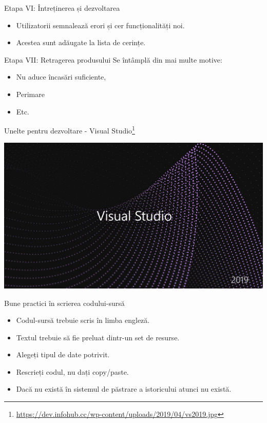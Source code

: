 \documentclass[presentation]{beamer}
\begin{document}
\begin{frame}[label={sec:orgb32584a}]{Etapa VI: Întreținerea și dezvoltarea}
\begin{itemize}
\item Utilizatorii semnalează erori și cer funcționalități noi.
\item Acestea sunt adăugate la lista de cerințe.
\end{itemize}
\end{frame}
\begin{frame}[label={sec:org1072855}]{Etapa VII: Retragerea produsului}
Se întâmplă din mai multe motive:
\begin{itemize}
\item Nu aduce încasări suficiente,
\item Perimare
\item Etc.
\end{itemize}
\end{frame}
\begin{frame}[label={sec:org5a62abc}]{Unelte pentru dezvoltare - Visual Studio\footnote{\url{https://dev.infohub.cc/wp-content/uploads/2019/04/vs2019.jpg}}}
\begin{center}
\includegraphics[width=.9\linewidth]{img/vs2019.jpg}
\end{center}
\end{frame}
\begin{frame}[label={sec:orgd224fc1}]{Bune practici în scrierea codului-sursă}
\begin{itemize}
\item Codul-sursă trebuie scris în limba engleză.
\item Textul trebuie să fie preluat dintr-un set de resurse.
\item Alegeți tipul de date potrivit.
\item Rescrieți codul, nu dați copy/paste.
\item Dacă nu există în sistemul de păstrare a istoricului atunci nu există.
\end{itemize}
\end{frame}
\end{document}
